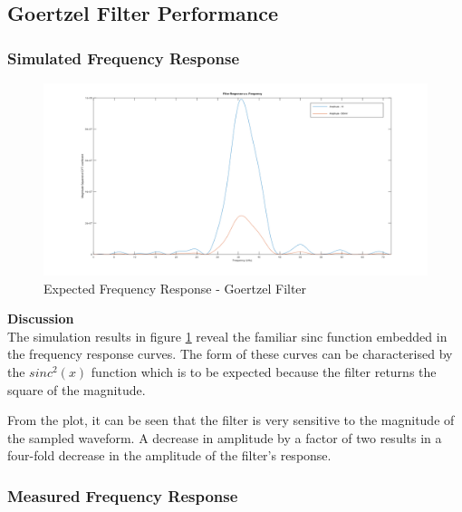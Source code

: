 \subsection{Goertzel Filter Performance}

\subsubsection{Simulated Frequency Response}
\label{sec:results_frequency_response}

\begin{figure}[H]
	\centering
	\includegraphics[width=\linewidth]{figures/results/goertzel_filter_simulation_wide.png}
	\caption{Expected Frequency Response - Goertzel Filter}
	\label{fig:goertzel_filter_response_simulated}
\end{figure}



\textbf{Discussion}\\
The simulation results in figure \ref{fig:goertzel_filter_response_simulated} reveal the familiar sinc function embedded in the frequency response curves. The form of these curves can be characterised by the $sinc^2(x)$ function which is to be expected because the filter returns the square of the magnitude.

From the plot, it can be seen that the filter is very sensitive to the magnitude of the sampled waveform. A decrease in amplitude by a factor of two results in a four-fold decrease in the amplitude of the filter's response.




\subsubsection{Measured Frequency Response}

